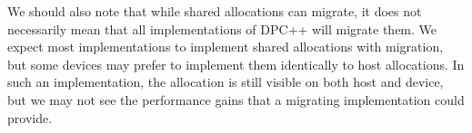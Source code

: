 We should also note that while shared allocations can migrate, it does not necessarily mean that all implementations of DPC++ will migrate them. We expect most implementations to implement shared allocations with migration, but some devices may prefer to implement them identically to host allocations. In such an implementation, the allocation is still visible on both host and device, but we may not see the performance gains that a migrating implementation could provide.\par






































